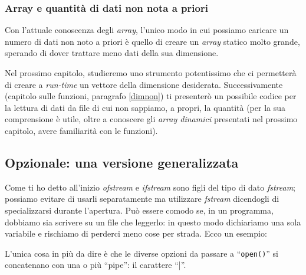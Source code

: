 \subsubsection{Array e quantità di dati non nota a priori}
Con l'attuale conoscenza degli \emph{array}, l'unico modo in cui possiamo caricare un numero di dati non noto a priori è quello di creare un \emph{array} statico molto grande, sperando di dover trattare meno dati della sua dimensione. 

Nel prossimo capitolo, studieremo uno strumento potentissimo che ci permetterà di creare a \emph{run-time} un vettore della dimensione desiderata. Successivamente (capitolo sulle funzioni, paragrafo \ref{dimnon}) ti presenterò un possibile codice per la lettura di dati da file di cui non sappiamo, a propri, la quantità (per la sua comprensione è utile, oltre a conoscere gli \emph{array dinamici} presentati nel prossimo capitolo, avere familiarità con le funzioni).
\begin{small}
\subsection{Opzionale: una versione generalizzata}
Come ti ho detto all'inizio \emph{ofstream} e \emph{ifstream} sono figli del tipo di dato \emph{fstream}; possiamo evitare di usarli separatamente ma utilizzare \emph{fstream} dicendogli di specializzarsi durante l'apertura. Può essere comodo se, in un programma, dobbiamo sia scrivere su un file che leggerlo: in questo modo dichiariamo una sola variabile e rischiamo di perderci meno cose per strada. Ecco un esempio:


L'unica cosa in più da dire è che le diverse opzioni da passare a ``\verb|open()|'' si concatenano con una o più ``pipe'': il carattere ``|''.
\end{small}

